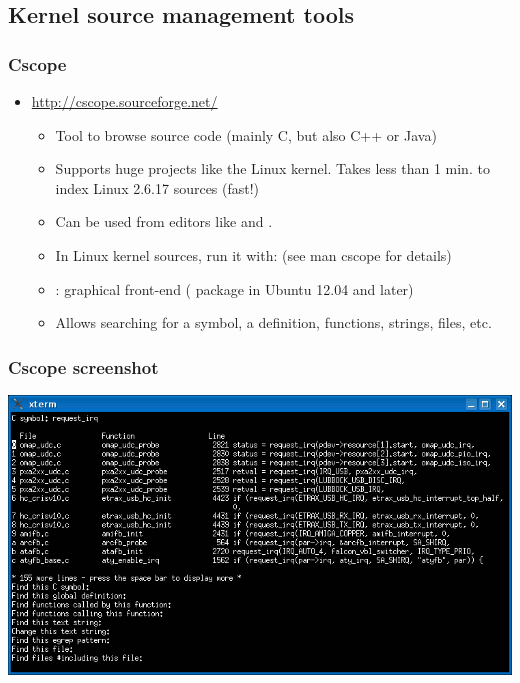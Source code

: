 \subsection{Kernel source management tools}

\begin{frame}
  \frametitle{Cscope}
  \begin{itemize}
  \item \url{http://cscope.sourceforge.net/}
    \begin{itemize}
    \item Tool to browse source code (mainly C, but also C++ or Java)
    \item Supports huge projects like the Linux kernel. Takes less
      than 1 min. to index Linux 2.6.17 sources (fast!)
    \item Can be used from editors like  and .
    \item In Linux kernel sources, run it with:  (see
      man cscope for details)
    \item {}: graphical front-end
      ( package in Ubuntu 12.04 and later)
    \item Allows searching for a symbol, a definition, functions,
      strings, files, etc.
    \end{itemize}
  \end{itemize}
\end{frame}

\begin{frame}
  \frametitle{Cscope screenshot}
  \begin{center}
    \includegraphics[width=\textwidth]{slides/kernel-source-code-management/cscope.png}
  \end{center}
\end{frame}

